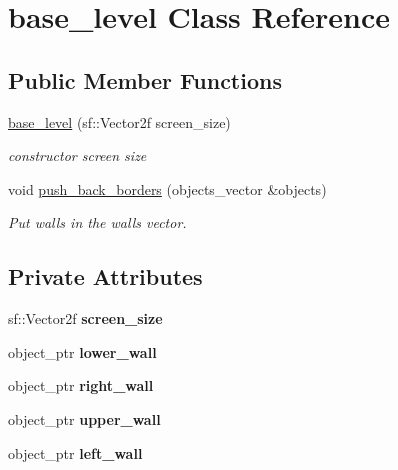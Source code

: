 \hypertarget{classbase__level}{}\section{base\+\_\+level Class Reference}
\label{classbase__level}
\subsection*{Public Member Functions}
\begin{DoxyCompactItemize}
\item 
\hyperlink{classbase__level_addf165fdc5f4e953be3b6a2dcd00459b}{base\+\_\+level} (sf\+::\+Vector2f screen\+\_\+size)
\begin{DoxyCompactList}\small\item\em constructor screen size \end{DoxyCompactList}\item 
void \hyperlink{classbase__level_a3b2da28cf45cad434103e81ee6c4538d}{push\+\_\+back\+\_\+borders} (objects\+\_\+vector \&objects)
\begin{DoxyCompactList}\small\item\em Put walls in the walls vector. \end{DoxyCompactList}\end{DoxyCompactItemize}
\subsection*{Private Attributes}
\begin{DoxyCompactItemize}
\item 
\mbox{\label{classbase__level_a69702ca202fa2a3a4c83faaa807971c2}} 
sf\+::\+Vector2f {\bfseries screen\+\_\+size}
\item 
\mbox{\label{classbase__level_a196474637fdc953f4f2ed088ace891f7}} 
object\+\_\+ptr {\bfseries lower\+\_\+wall}
\item 
\mbox{\label{classbase__level_a4a1f6a57a83aec4bd0b82072ab21df43}} 
object\+\_\+ptr {\bfseries right\+\_\+wall}
\item 
\mbox{\label{classbase__level_a5e4ab9bce71cb388025305d0f20cb7bf}} 
object\+\_\+ptr {\bfseries upper\+\_\+wall}
\item 
\mbox{\label{classbase__level_a29e885695d2a043bdab849dcb73c5c8e}} 
object\+\_\+ptr {\bfseries left\+\_\+wall}
\end{DoxyCompactItemize}


